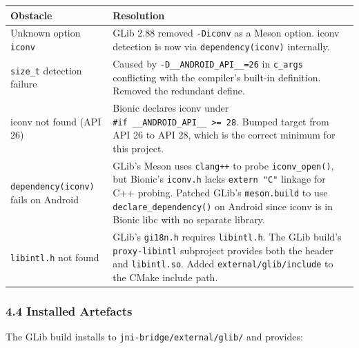\documentclass[11pt,a4paper]{article}
\begin{document}
\begin{longtable}[]{@{}
  >{\raggedright\arraybackslash}p{}
  >{\raggedright\arraybackslash}p{}@{}}
\toprule\noalign{}
\begin{minipage}[b]{\linewidth}\raggedright
Obstacle
\end{minipage} & \begin{minipage}[b]{\linewidth}\raggedright
Resolution
\end{minipage} \\
\midrule\noalign{}
\endhead
\bottomrule\noalign{}
\endlastfoot
Unknown option \texttt{iconv} & GLib 2.88 removed \texttt{-Diconv} as a
Meson option. iconv detection is now via
\texttt{dependency(\textquotesingle{}iconv\textquotesingle{})}
internally. \\
\texttt{size\_t} detection failure & Caused by
\texttt{-D\_\_ANDROID\_API\_\_=26} in \texttt{c\_args} conflicting with
the compiler's built-in definition. Removed the redundant define. \\
iconv not found (API 26) & Bionic declares iconv under
\texttt{\#if\ \_\_ANDROID\_API\_\_\ \textgreater{}=\ 28}. Bumped target
from API 26 to API 28, which is the correct minimum for this project. \\
\texttt{dependency(\textquotesingle{}iconv\textquotesingle{})} fails on
Android & GLib's Meson uses \texttt{clang++} to probe
\texttt{iconv\_open()}, but Bionic's \texttt{iconv.h} lacks
\texttt{extern\ "C"} linkage for C++ probing. Patched GLib's
\texttt{meson.build} to use \texttt{declare\_dependency()} on Android
since iconv is in Bionic libc with no separate library. \\
\texttt{libintl.h} not found & GLib's \texttt{gi18n.h} requires
\texttt{libintl.h}. The GLib build's \texttt{proxy-libintl} subproject
provides both the header and \texttt{libintl.so}. Added
\texttt{external/glib/include} to the CMake include path. \\
\end{longtable}

\subsubsection{4.4 Installed Artefacts}\label{installed-artefacts}

The GLib build installs to \texttt{jni-bridge/external/glib/} and
provides:
\end{document}
